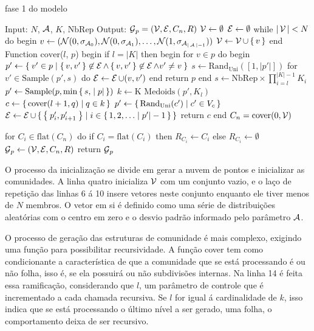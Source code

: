 \documentclass[notes.tex]{subfiles}
\begin{document}
\begin{quadro}[htbp]
\caption{fase 1 do modelo}
\label{qua:fase_1}
\begin{algorithm}
Input: $N$, $\operatorname{\mathcal{A}}$, $K$, $\text{NbRep}$
Output: $\operatorname{\mathcal{G}}_p = (\operatorname{\mathcal{V}}, \operatorname{\mathcal{E}}, C_n, R)$
$\operatorname{\mathcal{V}} \leftarrow \emptyset$
$\operatorname{\mathcal{E}} \leftarrow \emptyset$
while $|\operatorname{\mathcal{V}}| < N$ do
begin
    $v \leftarrow (\mathcal{N}(0, \sigma_{\operatorname{\mathcal{A}}_0}), \mathcal{N}(0, \sigma_{\operatorname{\mathcal{A}}_1}), \ldots, \mathcal{N}(1, \sigma_{\operatorname{\mathcal{A}}_{|\operatorname{\mathcal{A}}|-1}}))$
    $\operatorname{\mathcal{V}} \leftarrow \operatorname{\mathcal{V}} \cup \set{v}$
end
Function $\text{cover}$($l$, $p$)
begin
    if $l = |K|$ then
    begin
        for $v \in p$ do
        begin
            $p' \leftarrow \Set{v' \in p | \set{v, v'} \not\in \operatorname{\mathcal{E}}\land \set{v, v'} \not\in \operatorname{\mathcal{E}}\land v' \neq v}$
            $s \leftarrow \text{Rand}_\text{Uni}([1, |p'|])$
            for $v'\in \text{Sample}(p', s)$ do $\operatorname{\mathcal{E}} \leftarrow \operatorname{\mathcal{E}} \cup (v, v')$
        end
        return $p$
    end
    $s \leftarrow \text{NbRep}\times\prod_{i=l}^{|K|-1} K_i$
    $p' \leftarrow \text{Sample}(p, \min\set{s, |p|})$
    $k \leftarrow \text{K Medoids}(p', K_l)$ 
    $c \leftarrow \set{\text{cover}(l+1, q) | q \in k}$
    $p' \leftarrow \set{\text{Rand}_\text{Uni}(c') | c' \in V_c}$
    $\operatorname{\mathcal{E}} \leftarrow \operatorname{\mathcal{E}} \cup \set{\Set{p'_i, p'_{i+1}}| i \in \set{1, 2, \ldots |p'| -1}}$
    return $c$
end
$C_n = \text{cover}(0, \operatorname{\mathcal{V}})$

for $C_i \in \text{flat}(C_n)$ do
    if $C_i = \text{flat}(C_i)$ then $R_{C_i} \leftarrow C_i$
    else $R_{C_i} \leftarrow \emptyset$
$\operatorname{\mathcal{G}}_p \leftarrow (\operatorname{\mathcal{V}}, \operatorname{\mathcal{E}}, C_n, R)$
return $\operatorname{\mathcal{G}}_p$
\end{algorithm}
\end{quadro}

O processo da inicialização se divide em gerar a nuvem de pontos e inicializar as comunidades.
A linha quatro inicializa $\operatorname{\mathcal{V}}$ com um conjunto vazio, e o laço de repetição das linhas 6 á 10 insere vetores neste conjunto enquanto ele tiver menos de  $N$ membros.
O vetor em si é definido como uma série de distribuições aleatórias com o centro em zero e o desvio padrão informado pelo parâmetro $\operatorname{\mathcal{A}}$.

O processo de geração das estruturas de comunidade é mais complexo, exigindo uma função para possibilitar recursividade.
A função cover tem como condicionante a característica de que a comunidade que se está processando é ou não folha, isso é, se ela possuirá ou não subdivisões internas.
Na linha 14 é feita essa ramificação, considerando que $l$, um parâmetro de controle que é incrementado a cada chamada recursiva.
Se $l$ for igual á cardinalidade de $k$, isso indica que se está processando o último nível a ser gerado, uma folha, o comportamento deixa de ser recursivo.
\end{document}
